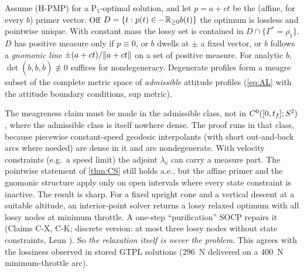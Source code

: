 \begin{theorem}\label{thm:CS}
Assume (H-PMP) for a $\mathrm P_1$-optimal solution, and let $p=a+ct$ be the (affine, for every $b$) primer vector. Off
$D=\{t:p(t)\in-\mathbb{R}_{\ge0}b(t)\}$ the optimum is lossless and pointwise unique. With constant mass the lossy set is contained in
$D\cap\{\Gamma^*=\rho_1\}$. $D$ has positive measure only if $p\equiv0$, or $b$ dwells at $\pm$ a fixed vector, or $b$ follows a
\emph{gnomonic line} $\pm(a+ct)/\lVert a+ct\rVert$ on a set of positive measure. For analytic $b$, $\det(b,\dot b,\ddot b)\not\equiv0$
suffices for nondegeneracy. Degenerate profiles form a meagre subset of the complete metric space of \emph{admissible} attitude
profiles (\eqref{eq:AL} with the attitude boundary conditions, sup metric).\Srep\
\end{theorem}
The meagreness claim must be made in the admissible class, not in $C^0([0,t_f];S^2)$, where the admissible class is itself
nowhere dense. The proof runs in that class, because piecewise constant-speed geodesic interpolants (with short out-and-back
arcs where needed) are dense in it and are nondegenerate. With velocity constraints (e.g.\ a speed limit) the adjoint $\lambda_v$
can carry a measure part. The pointwise statement of \cref{thm:CS} still holds a.e., but the affine primer and the gnomonic
structure apply only on open intervals where every state constraint is inactive.
The result is sharp. For a fixed upright cone and a vertical descent at a suitable altitude, an interior-point solver
returns a lossy relaxed optimum with all lossy nodes at minimum throttle. A one-step ``purification'' SOCP repairs it
(Claims C-X, C-K; discrete version: at most three lossy nodes without state constraints, Lean
\lean{purification\_three}). So \emph{the relaxation itself is never the problem}. This agrees with the lossiness observed in
stored GTPL solutions (296~N delivered on a 400~N minimum-throttle arc).

